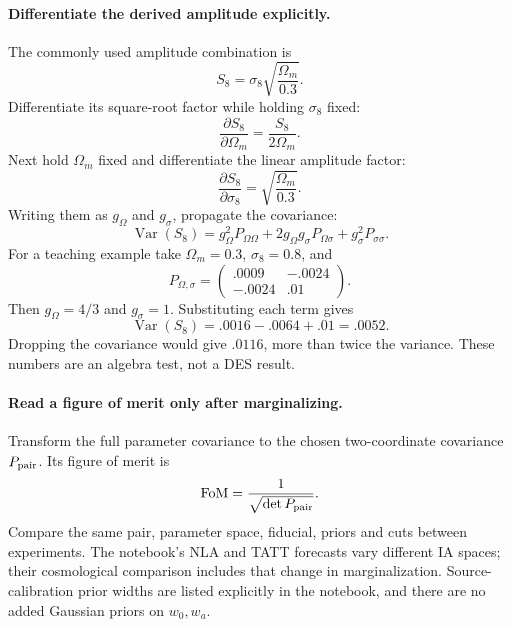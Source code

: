 \documentclass[11pt]{article}
\begin{document}
\paragraph{Differentiate the derived amplitude explicitly.}
The commonly used amplitude combination is
\begin{equation}
 S_8=\sigma_8\sqrt{\frac{\Omega_m}{0.3}}.
\end{equation}
Differentiate its square-root factor while holding $\sigma_8$ fixed:
\begin{equation}
 \frac{\partial S_8}{\partial\Omega_m}=\frac{S_8}{2\Omega_m}.
\end{equation}
Next hold $\Omega_m$ fixed and differentiate the linear amplitude factor:
\begin{equation}
 \frac{\partial S_8}{\partial\sigma_8}=\sqrt{\frac{\Omega_m}{0.3}}.
\end{equation}
Writing them as $g_\Omega$ and $g_\sigma$, propagate the covariance:
\begin{equation}
 \operatorname{Var}(S_8)=g_\Omega^2P_{\Omega\Omega}
 +2g_\Omega g_\sigma P_{\Omega\sigma}+g_\sigma^2P_{\sigma\sigma}.
\end{equation}
For a teaching example take $\Omega_m=0.3$, $\sigma_8=0.8$, and
\begin{equation}
 P_{\Omega,\sigma}=\begin{pmatrix}.0009&-.0024\\-.0024&.01\end{pmatrix}.
\end{equation}
Then $g_\Omega=4/3$ and $g_\sigma=1$. Substituting each term gives
\begin{equation}
 \operatorname{Var}(S_8)=.0016-.0064+.01=.0052.
\end{equation}
Dropping the covariance would give $.0116$, more than twice the variance.
These numbers are an algebra test, not a DES result.

\paragraph{Read a figure of merit only after marginalizing.}
Transform the full parameter covariance to the chosen two-coordinate
covariance $P_{\rm pair}$. Its figure of merit is
\begin{equation}
 \mathrm{FoM}=\frac1{\sqrt{\det P_{\rm pair}}}.
\end{equation}
Compare the same pair, parameter space, fiducial, priors and cuts between
experiments. The notebook's NLA and TATT forecasts vary different IA
spaces; their cosmological comparison includes that change in
marginalization. Source-calibration prior widths are listed explicitly in
the notebook, and there are no added Gaussian priors on $w_0,w_a$.
\end{document}
